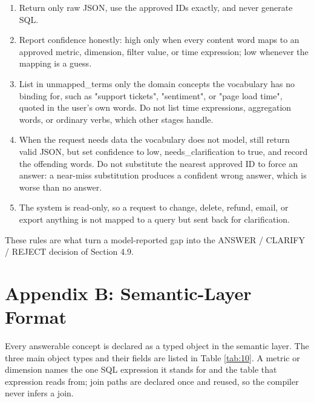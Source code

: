 \documentclass[pdflatex,sn-mathphys-num]{sn-jnl}
\begin{document}
\begin{enumerate}
\item Return only raw JSON, use the approved IDs exactly, and never generate SQL.
\item Report confidence honestly: high only when every content word maps to an approved metric, dimension, filter value, or time expression; low whenever the mapping is a guess.
\item List in unmapped\_terms only the domain concepts the vocabulary has no binding for, such as "support tickets", "sentiment", or "page load time", quoted in the user's own words. Do not list time expressions, aggregation words, or ordinary verbs, which other stages handle.
\item When the request needs data the vocabulary does not model, still return valid JSON, but set confidence to low, needs\_clarification to true, and record the offending words. Do not substitute the nearest approved ID to force an answer: a near-miss substitution produces a confident wrong answer, which is worse than no answer.
\item The system is read-only, so a request to change, delete, refund, email, or export anything is not mapped to a query but sent back for clarification.
\end{enumerate}

These rules are what turn a model-reported gap into the ANSWER / CLARIFY / REJECT decision of Section 4.9.


\section{Appendix B: Semantic-Layer Format}

Every answerable concept is declared as a typed object in the semantic layer. The three main object types and their fields are listed in Table \ref{tab:10}. A metric or dimension names the one SQL expression it stands for and the table that expression reads from; join paths are declared once and reused, so the compiler never infers a join.
\end{document}
